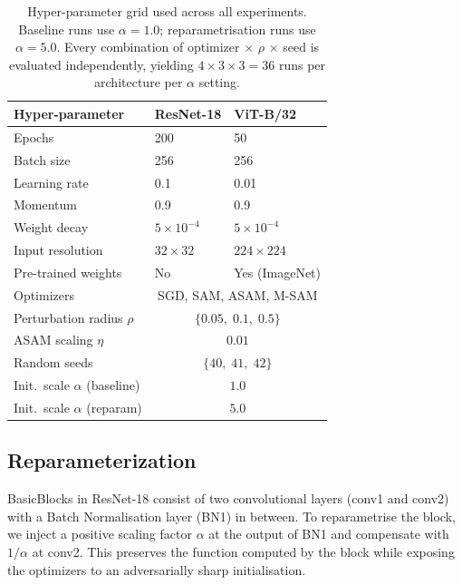 \documentclass{article}
\begin{document}
\begin{table}[H]
\centering
\caption{Hyper-parameter grid used across all experiments. Baseline runs use $\alpha=1.0$; reparametrisation runs use $\alpha=5.0$. Every combination of optimizer $\times$ $\rho$ $\times$ seed is evaluated independently, yielding $4 \times 3 \times 3 = 36$ runs per architecture per $\alpha$ setting.}
\label{tab:hyperparameters}
\begin{tabular}{lll}
\toprule
\textbf{Hyper-parameter} & \textbf{ResNet-18} & \textbf{ViT-B/32} \\
\midrule
Epochs                        & 200               & 50 \\
Batch size                    & 256               & 256 \\
Learning rate                 & 0.1               & 0.01 \\
Momentum                      & 0.9               & 0.9 \\
Weight decay                  & $5\times10^{-4}$  & $5\times10^{-4}$ \\
Input resolution              & $32\times32$      & $224\times224$ \\
Pre-trained weights           & No                & Yes (ImageNet) \\
\midrule
Optimizers                    & \multicolumn{2}{c}{SGD, SAM, ASAM, M-SAM} \\
Perturbation radius $\rho$    & \multicolumn{2}{c}{$\{0.05,\; 0.1,\; 0.5\}$} \\
ASAM scaling $\eta$           & \multicolumn{2}{c}{$0.01$} \\
Random seeds                  & \multicolumn{2}{c}{$\{40,\; 41,\; 42\}$} \\
\midrule
Init.\ scale $\alpha$ (baseline)   & \multicolumn{2}{c}{$1.0$} \\
Init.\ scale $\alpha$ (reparam)    & \multicolumn{2}{c}{$5.0$} \\
\bottomrule
\end{tabular}
\end{table}

\label{appendix:reparametrization}
\subsection{Reparameterization}
BasicBlocks in ResNet-18 consist of two convolutional layers (conv1 and conv2) with a Batch Normalisation layer (BN1) in between. To reparametrise the block, we inject a positive scaling factor $\alpha$ at the output of BN1 and compensate with $1/\alpha$ at conv2. This preserves the function computed by the block while exposing the optimizers to an adversarially sharp initialisation.
\end{document}
